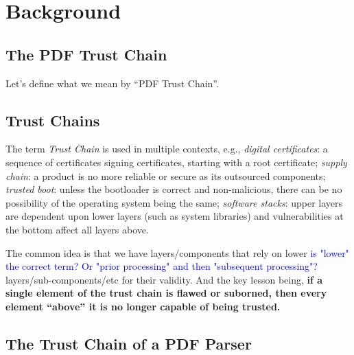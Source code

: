 \section{Background}
\label{sec:background}

\subsection{The PDF Trust Chain }
\label{sec:trust-chain}

Let's define what we mean by ``PDF Trust Chain''.

\subsection{Trust Chains}

The term \emph{Trust Chain} is used in multiple contexts, e.g.,
\emph{digital certificates}: a sequence of certificates signing certificates,
starting with a root certificate;
\emph{supply chain}: a product is no more reliable or secure as its
outsourced components;
\emph{trusted boot}: unless the bootloader is correct and non-malicious,
there can be no possibility of the operating system being the same;
\emph{software stacks}: upper layers are dependent upon lower layers (such as
system libraries) and vulnerabilities at the bottom affect all layers above.

The common idea is that we have layers/components that rely on lower
\textcolor{blue}{is "lower" the correct term? Or "prior processing" and then "subsequent processing"?}
layers/sub-components/etc for their validity.
And the key lesson being,
{\bf{if a single element of the trust chain 
  is flawed or suborned, then every element ``above'' it
  is no longer capable of being trusted.}}


\subsection{The Trust Chain of a PDF Parser}


